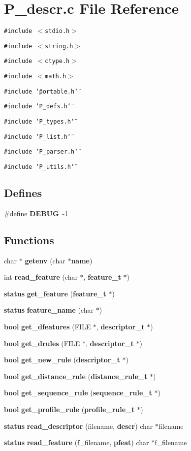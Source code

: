 \section{P\_\-descr.c File Reference}
\label{P__descr_8c}
{\tt \#include $<$stdio.h$>$}\par
{\tt \#include $<$string.h$>$}\par
{\tt \#include $<$ctype.h$>$}\par
{\tt \#include $<$math.h$>$}\par
{\tt \#include \char`\"{}portable.h\char`\"{}}\par
{\tt \#include \char`\"{}P\_\-defs.h\char`\"{}}\par
{\tt \#include \char`\"{}P\_\-types.h\char`\"{}}\par
{\tt \#include \char`\"{}P\_\-list.h\char`\"{}}\par
{\tt \#include \char`\"{}P\_\-parser.h\char`\"{}}\par
{\tt \#include \char`\"{}P\_\-utils.h\char`\"{}}\par
\subsection*{Defines}
\begin{CompactItemize}
\item 
\#define {\bf DEBUG}\ -1
\end{CompactItemize}
\subsection*{Functions}
\begin{CompactItemize}
\item 
char $\ast$ {\bf getenv} (char $\ast${\bf name})
\item 
int {\bf read\_\-feature} (char $\ast$, {\bf feature\_\-t} $\ast$)
\item 
{\bf status} {\bf get\_\-feature} ({\bf feature\_\-t} $\ast$)
\item 
{\bf status} {\bf feature\_\-name} (char $\ast$)
\item 
{\bf bool} {\bf get\_\-dfeatures} (FILE $\ast$, {\bf descriptor\_\-t} $\ast$)
\item 
{\bf bool} {\bf get\_\-drules} (FILE $\ast$, {\bf descriptor\_\-t} $\ast$)
\item 
{\bf bool} {\bf get\_\-new\_\-rule} ({\bf descriptor\_\-t} $\ast$)
\item 
{\bf bool} {\bf get\_\-distance\_\-rule} ({\bf distance\_\-rule\_\-t} $\ast$)
\item 
{\bf bool} {\bf get\_\-sequence\_\-rule} ({\bf sequence\_\-rule\_\-t} $\ast$)
\item 
{\bf bool} {\bf get\_\-profile\_\-rule} ({\bf profile\_\-rule\_\-t} $\ast$)
\item 
{\bf status} {\bf read\_\-descriptor} (filename, {\bf descr}) char $\ast$filename
\item 
{\bf status} {\bf read\_\-feature} (f\_\-filename, {\bf pfeat}) char $\ast$f\_\-filename
\end{CompactItemize}
